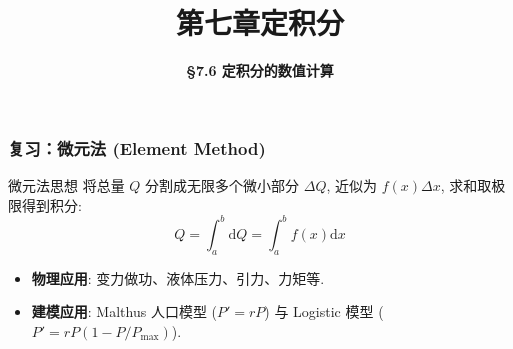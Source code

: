 \everymath{\displaystyle}



\title[第七章\\
定积分]{\texorpdfstring{\LARGE \bfseries 第七章\quad 定积分}{第七章 定积分}} %
\author[\smaller \S 7.6\\
定积分数值计算] %
{\Large \bfseries \S 7.6 定积分的数值计算}
\date{}





\begin{frame}

\titlepage %

\end{frame}





\begin{frame}
\frametitle{复习：微元法 (Element Method)}
\begin{block}{微元法思想}
将总量 $Q$ 分割成无限多个微小部分 $\Delta Q$, 近似为 $f(x)\Delta x$, 求和取极限得到积分:
\[ Q = \int_a^b \mathrm{d}Q = \int_a^b f(x) \mathrm{d}x \]
\end{block}
\begin{itemize}
\item \textbf{物理应用}: 变力做功、液体压力、引力、力矩等.
\item \textbf{建模应用}: Malthus 人口模型 ($P' = rP$) 与 Logistic 模型 ($P' = rP(1-P/P_{\max})$).
\end{itemize}
\end{frame}


